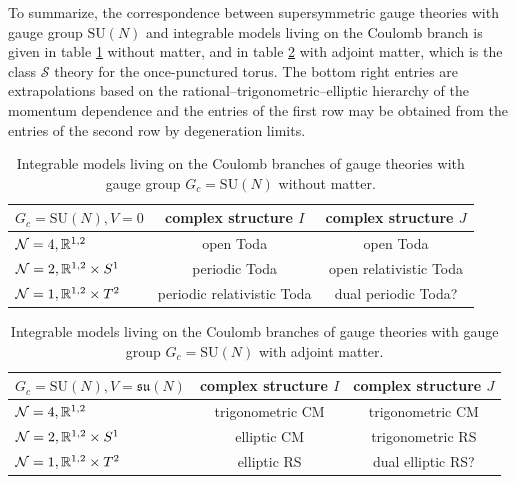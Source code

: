 To summarize, the correspondence between supersymmetric gauge theories with gauge group $\mathrm{SU}(N)$ and integrable models living on the Coulomb branch is given in table \ref{table:intSysPure} without matter, and in table \ref{table:intSysAdjoint} with adjoint matter, which is the class $\mathcal{S}$ theory for the once-punctured torus. The bottom right entries are extrapolations based on the rational--trigonometric--elliptic hierarchy of the momentum dependence and the entries of the first row may be obtained from the entries of the second row by degeneration limits.
\begin{table}[h]
	\centering
	\begin{tabular}{|l|c|c|}
		\hline
		$G_c=\mathrm{SU}(N),V=0$ & complex structure $I$ & complex structure $J$ \\
		\hline
		$\mathcal{N}=4, \mathbb{R}^{1,2}$ & open Toda & open Toda \\
		$\mathcal{N}=2, \mathbb{R}^{1,2} \times S^1$ & periodic Toda \cite{gorsky_integrability_1995,martinec_integrable_1996} & open relativistic Toda \cite{bezrukavnikov_equivariant_2026} \\
		$\mathcal{N}=1, \mathbb{R}^{1,2} \times T^2$ & periodic relativistic Toda \cite{nekrasov_five_1998} & dual periodic Toda? \\ \hline
	\end{tabular}
	\caption[Coulomb branches without matter]{Integrable models living on the Coulomb branches of gauge theories with gauge group $G_c = \mathrm{SU}(N)$ without matter.\label{table:intSysPure}}
\end{table}
\begin{table}[h]
	\centering
	\begin{tabular}{|l|c|c|}
		\hline
		$G_c=\mathrm{SU}(N),V=\mathfrak{su}(N)$ & complex structure $I$ & complex structure $J$ \\
		\hline
		$\mathcal{N}=4, \mathbb{R}^{1,2}$ & trigonometric CM & trigonometric CM \\
		$\mathcal{N}=2, \mathbb{R}^{1,2} \times S^1$ & elliptic CM \cite{dhoker_calogero-moser_1998} & trigonometric RS \cite{braverman_cyclotomic_2020} \\
		$\mathcal{N}=1, \mathbb{R}^{1,2} \times T^2$ & elliptic RS \cite{nekrasov_five_1998} & dual elliptic RS? \\ \hline
\end{tabular}
	\caption[Coulomb branches with adjoint matter]{Integrable models living on the Coulomb branches of gauge theories with gauge group $G_c = \mathrm{SU}(N)$ with adjoint matter.\label{table:intSysAdjoint}}
\end{table}

